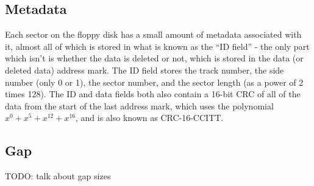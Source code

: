 \documentclass[a4paper]{article}
\begin{document}
\subsection{Metadata}

Each sector on the floppy disk has a small amount of metadata
associated with it, almost all of which is stored in what is known as
the ``ID field'' - the only part which isn't is whether the data is
deleted or not, which is stored in the data (or deleted data) address
mark. The ID field stores the track number, the side number (only 0 or
1), the sector number, and the sector length (as a power of 2 times
128). The ID and data fields both also contain a 16-bit CRC of all of
the data from the start of the last address mark, which uses the
polynomial \(x^0 + x^5 + x^{12} + x^{16}\), and is also known as
CRC-16-CCITT.

\subsection{Gap}

TODO: talk about gap sizes
\end{document}
